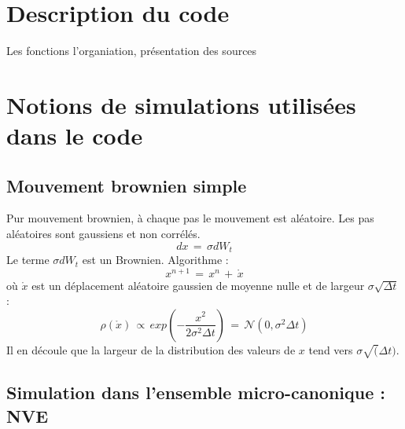 \documentclass[11pt,a4paper,fleqn]{book}
\begin{document}

\chapter{Description du code}

Les fonctions l'organiation, présentation des sources


\chapter{Notions de simulations utilisées dans le code}

\section{Mouvement brownien simple}

Pur mouvement brownien, à chaque pas le mouvement est aléatoire. Les pas aléatoires
sont gaussiens et non corrélés.
%
\begin{equation*}
	d x \, = \, \sigma d W_t
\end{equation*}
%
Le terme $\sigma d W_t$ est un Brownien. Algorithme :
%
\begin{equation*}
	x^{n+1} \, = \, x^n \, + \, \mathring{x}
\end{equation*}
%
où $\mathring{x}$ est un déplacement aléatoire gaussien de moyenne nulle et 
de largeur $\sigma \sqrt{\Delta t}$ :
%
\begin{equation}\label{eq_dx_rand}
	\rho(\mathring{x}) \, \propto \, exp\left( -\frac{x^2}{2 \sigma^2 \Delta t} \right)
		\, = \, \mathcal{N}(0,\sigma^2 \Delta t)
\end{equation}
%
Il en découle que la largeur de la distribution des valeurs de $x$ tend vers
$\sigma \sqrt(\Delta t)$. 


\section{Simulation dans l'ensemble micro-canonique : NVE}
\end{document}
